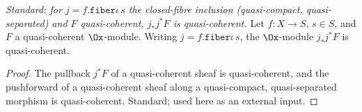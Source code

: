 \begin{theorem}
  \label{thm:ega_fibre_pushforward_qcoh}
  \textit{Standard: for $j = f.\mathtt{fiber}\iota\,s$ the closed-fibre inclusion
  (quasi-compact, quasi-separated) and $F$ quasi-coherent, $j_*j^*F$ is
  quasi-coherent.}
  Let $f : X \to S$, $s \in S$, and $F$ a quasi-coherent $\Ox$-module. Writing
  $j = f.\mathtt{fiber}\iota\,s$, the $\Ox$-module $j_*j^*F$ is quasi-coherent.
  \begin{proof}
    The pullback $j^*F$ of a quasi-coherent sheaf is quasi-coherent, and the
    pushforward of a quasi-coherent sheaf along a quasi-compact, quasi-separated
    morphism is quasi-coherent. Standard; used here as an external input.
  \end{proof}
\end{theorem}

